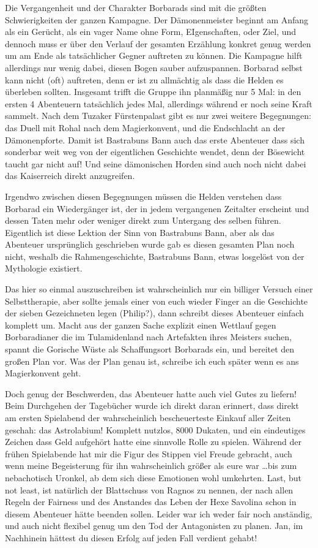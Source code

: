 Die Vergangenheit und der Charakter Borbarads sind mit die größten Schwierigkeiten der ganzen Kampagne.
Der Dämonenmeister beginnt am Anfang als ein Gerücht, als ein vager Name ohne Form, EIgenschaften, oder Ziel, und dennoch muss er über den Verlauf der gesamten Erzählung konkret genug werden um am Ende als tatsächlicher Gegner auftreten zu können.
Die Kampagne hilft allerdings nur wenig dabei, diesen Bogen sauber aufzuspannen.
Borbarad selbst kann nicht (oft) auftreten, denn er ist zu allmächtig als dass die Helden es überleben sollten.
Insgesamt trifft die Gruppe ihn planmäßig nur 5 Mal: in den ersten 4 Abenteuern tatsächlich jedes Mal, allerdings während er noch seine Kraft sammelt.
Nach dem Tuzaker Fürstenpalast gibt es nur zwei weitere Begegnungen: das Duell mit Rohal nach dem Magierkonvent, und die Endschlacht an der Dämonenpforte.
Damit ist Bastrabuns Bann auch das erste Abenteuer dass sich sonderbar weit weg von der eigentlichen Geschichte wendet, denn der Bösewicht taucht gar nicht auf!
Und seine dämonischen Horden sind auch noch nicht dabei das Kaiserreich direkt anzugreifen.

Irgendwo zwischen diesen Begegnungen müssen die Helden verstehen dass Borbarad ein Wiedergänger ist, der in jedem vergangenen Zeitalter erscheint und dessen Taten mehr oder weniger direkt zum Untergang des selben führen.
Eigentlich ist diese Lektion der Sinn von Bastrabuns Bann, aber als das Abenteuer ursprünglich geschrieben wurde gab es diesen gesamten Plan noch nicht, weshalb die Rahmengeschichte, Bastrabuns Bann, etwas losgelöst von der Mythologie existiert.

Das hier so einmal auszuschreiben ist wahrscheinlich nur ein billiger Versuch einer Selbsttherapie, aber sollte jemals einer von euch wieder Finger an die Geschichte der sieben Gezeichneten legen (Philip?), dann schreibt dieses Abenteuer einfach komplett um.
Macht aus der ganzen Sache explizit einen Wettlauf gegen Borbaradianer die im Tulamidenland nach Artefakten ihres Meisters suchen, spannt die Gorische Wüste als Schaffungsort Borbarads ein, und bereitet den großen Plan vor.
Was der Plan genau ist, schreibe ich euch später wenn es ans Magierkonvent geht.

Doch genug der Beschwerden, das Abenteuer hatte auch viel Gutes zu liefern! Beim Durchgehen der Tagebücher wurde ich direkt daran erinnert, dass direkt am ersten Spielabend der wahrscheinlich bescheuerteste Einkauf aller Zeiten geschah: das Astrolabium! Komplett nutzlos, 8000 Dukaten, und ein eindeutiges Zeichen dass Geld aufgehört hatte eine sinnvolle Rolle zu spielen.
Während der frühen Spielabende hat mir die Figur des Stippen viel Freude gebracht, auch wenn meine Begeisterung für ihn wahrscheinlich größer als eure war \dots bis zum nebachotisch Uronkel, ab dem sich diese Emotionen wohl umkehrten.
Last, but not least, ist natürlich der Blattschuss von Ragnos zu nennen, der nach allen Regeln der Fairness und des Anstandes das Leben der Hexe Savolina schon in diesem Abenteuer hätte beenden sollen.
Leider war ich weder fair noch anständig, und auch nicht flexibel genug um den Tod der Antagonisten zu planen.
Jan, im Nachhinein hättest du diesen Erfolg auf jeden Fall verdient gehabt!


